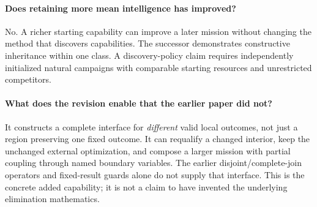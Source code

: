 \documentclass[11pt,letterpaper]{article}
\theoremstyle{definition}\newtheorem{definition}[theorem]{Definition}
\theoremstyle{remark}\newtheorem{remark}[theorem]{Remark}
\newcommand{\phead}[1]{\Needspace{4\baselineskip}\paragraph{#1}}
\begin{document}
\phead{Does retaining more mean intelligence has improved?}
No. A richer starting capability can improve a later mission without changing the method that discovers capabilities. The successor demonstrates constructive inheritance within one class. A discovery-policy claim requires independently initialized natural campaigns with comparable starting resources and unrestricted competitors.

\phead{What does the revision enable that the earlier paper did not?}
It constructs a complete interface for \emph{different} valid local outcomes, not just a region preserving one fixed outcome. It can requalify a changed interior, keep the unchanged external optimization, and compose a larger mission with partial coupling through named boundary variables. The earlier disjoint/complete-join operators and fixed-result guards alone do not supply that interface. This is the concrete added capability; it is not a claim to have invented the underlying elimination mathematics.
\end{document}
